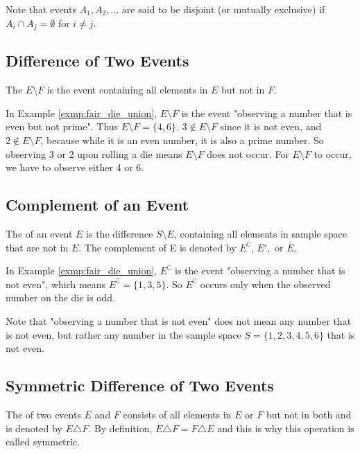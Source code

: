Note that events \( A_1, A_2, \ldots \) are said to be disjoint (or mutually exclusive) if \( A_i \cap A_j = \emptyset \) for \( i \neq j \).

\subsection{Difference of Two Events}

The  \( E \setminus F \) is the event containing all elements in \( E \) but not in \( F \).

\begin{exmp}
	In Example \autoref{exmp:fair_die_union}, \( E \setminus F \) is the event "observing a number that is even but not prime".
	Thus \( E \setminus F = \{ 4, 6 \} \).
	\( 3 \not\in E \setminus F \) since it is not even, and \( 2 \not\in E \setminus F \), because while it is an even number, it is also a prime number.
	So observing 3 or 2 upon rolling a die means \( E \setminus F \) does not occur.
	For \( E \setminus F \) to occur, we have to observe either 4 or 6.
\end{exmp}

\subsection{Complement of an Event}

The  of an event \( E \) is the difference \( S \setminus E \), containing all elements in sample space that are not in \( E \).
The complement of E is denoted by \( E^\complement \), \( E', \) or \( \bar{E} \).

\begin{exmp}
	In Example \autoref{exmp:fair_die_union}, \( E^\complement \) is the event "observing a number that is not even",
	which means \( E^\complement = \{ 1, 3, 5 \} \).
	So \( E^\complement \) occurs only when the observed number on the die is odd.

	Note that "observing a number that is not even" does not mean any number that is not even, but rather any number in the sample space \( S = \{ 1, 2, 3, 4, 5, 6 \} \) that is not even.
\end{exmp}

\subsection{Symmetric Difference of Two Events}

The  of two events \( E \) and \( F \) consists of all elements in
\( E \) or \( F \) but not in both and is denoted by \( E \triangle F \).
By definition, \( E \triangle F = F \triangle E \) and this is why this operation is called symmetric.

